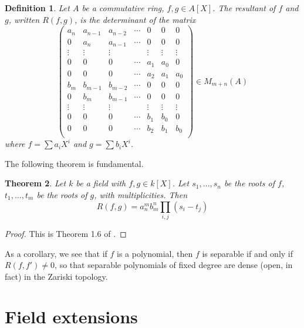 \documentclass{article}
\newtheorem{definition}{Definition}
\newtheorem{theorem}[definition]{Theorem}
\numberwithin{definition}{subsection}
\begin{document}
\begin{definition}\label{def-resultant}
Let $A$ be a commutative ring, $f,g\in A[X]$. The \emph{resultant} of $f$ and 
$g$, written $R(f,g)$, is the determinant of the matrix 
\[
  \begin{pmatrix}
    a_n    & a_{n-1} & a_{n-2} & \cdots & 0      & 0      & 0      \\
    0      & a_n     & a_{n-1} & \cdots & 0      & 0      & 0      \\
    \vdots & \vdots  & \vdots  &        & \vdots & \vdots & \vdots \\
    0      & 0       & 0       & \cdots & a_1    & a_0    & 0      \\
    0      & 0       & 0       & \cdots & a_2    & a_1    & a_0    \\ 
    b_m    & b_{m-1} & b_{m-2} & \cdots & 0      & 0      & 0      \\
    0      & b_m     & b_{m-1} & \cdots & 0      & 0      & 0      \\
    \vdots & \vdots  & \vdots  &        & \vdots & \vdots & \vdots \\
    0      & 0       & 0       & \cdots & b_1    & b_0    & 0      \\
    0      & 0       & 0       & \cdots & b_2    & b_1    & b_0    \\ 
  \end{pmatrix}
  \in M_{m+n}(A)
\]
where $f = \sum a_i X^i$ and $g = \sum b_i X^i$. 
\end{definition}

The following theorem is fundamental.
\begin{theorem}\label{resultant-main-theorem}
Let $k$ be a field with $f,g\in k[X]$. Let $s_1,\dotsc,s_n$ be the roots of 
$f$, $t_1,\dotsc,t_m$ be the roots of $g$, with multiplicities. Then 
\[
  R(f,g) = a_n^m b_m^n \prod_{i,j} (s_i-t_j)
\]
\end{theorem}
\begin{proof}
This is Theorem 1.6 of \cite{Jan}. 
\end{proof}

As a corollary, we see that if $f$ is a polynomial, then $f$ is separable if 
and only if $R(f,f') \ne 0$, so that separable polynomials of fixed degree are 
dense (open, in fact) in the Zariski topology. 










\section{Field extensions}
\end{document}
